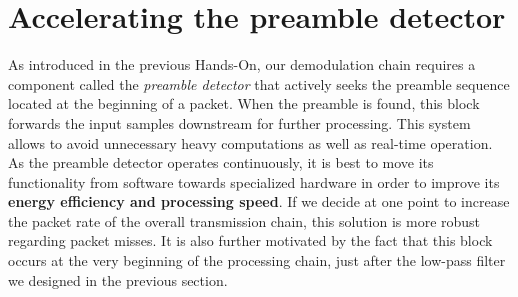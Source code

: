 \section{Accelerating the preamble detector}
As introduced in the previous Hands-On, our demodulation chain requires a component called the \textit{preamble detector} that actively seeks the preamble sequence located at the beginning of a packet. When the preamble is found, this block forwards the input samples downstream for further processing. This system allows to avoid unnecessary heavy computations as well as real-time operation. As the preamble detector operates continuously, it is best to move its functionality from software towards specialized hardware in order to improve its \textbf{energy efficiency and processing speed}. If we decide at one point to increase the packet rate of the overall transmission chain, this solution is more robust regarding packet misses. It is also further motivated by the fact that this block occurs at the very beginning of the processing chain, just after the low-pass filter we designed in the previous section.


